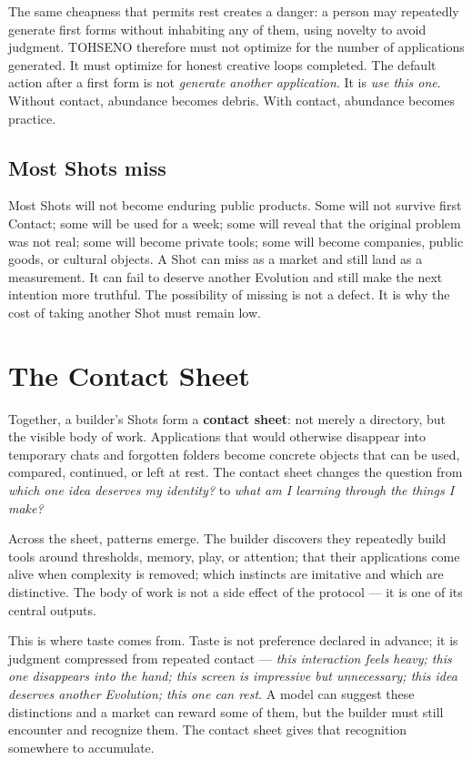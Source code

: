 \documentclass[11pt]{article}
\newcommand{\TOH}{TOHSENO}
\begin{document}
The same cheapness that permits rest creates a danger: a person may
repeatedly generate first forms without inhabiting any of them, using
novelty to avoid judgment. \TOH{} therefore must not optimize for the
number of applications generated. It must optimize for honest creative
loops completed. The default action after a first form is not
\emph{generate another application}. It is \emph{use this one}. Without
contact, abundance becomes debris. With contact, abundance becomes
practice.

\subsection{Most Shots miss}

Most Shots will not become enduring public products. Some will not
survive first Contact; some will be used for a week; some will reveal
that the original problem was not real; some will become private tools;
some will become companies, public goods, or cultural objects. A Shot
can miss as a market and still land as a measurement. It can fail to
deserve another Evolution and still make the next intention more
truthful. The possibility of missing is not a defect. It is why the cost
of taking another Shot must remain low.

\section{The Contact Sheet}

Together, a builder's Shots form a \textbf{contact sheet}: not merely a
directory, but the visible body of work. Applications that would
otherwise disappear into temporary chats and forgotten folders become
concrete objects that can be used, compared, continued, or left at rest.
The contact sheet changes the question from \emph{which one idea
deserves my identity?} to \emph{what am I learning through the things I
make?}

Across the sheet, patterns emerge. The builder discovers they repeatedly
build tools around thresholds, memory, play, or attention; that their
applications come alive when complexity is removed; which instincts are
imitative and which are distinctive. The body of work is not a side
effect of the protocol --- it is one of its central outputs.

This is where taste comes from. Taste is not preference declared in
advance; it is judgment compressed from repeated contact --- \emph{this
interaction feels heavy; this one disappears into the hand; this screen
is impressive but unnecessary; this idea deserves another Evolution;
this one can rest}. A model can suggest these distinctions and a market
can reward some of them, but the builder must still encounter and
recognize them. The contact sheet gives that recognition somewhere to
accumulate.
\end{document}
